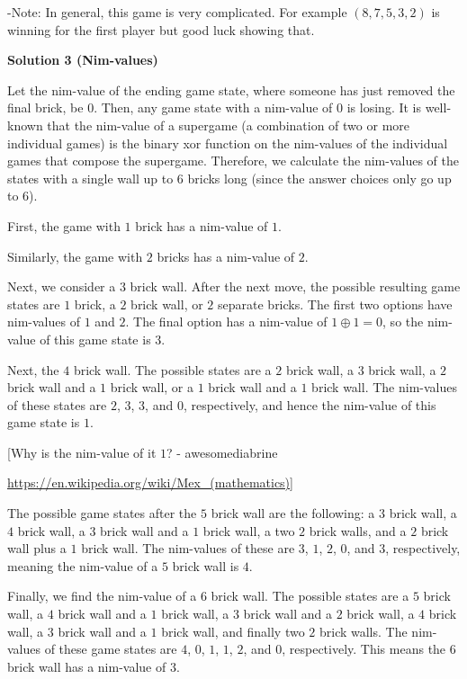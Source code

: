 \begin{enumerate}
 -Note: In general, this game is very complicated. For example $(8, 7, 5, 3, 2)$ is winning for the first player but good luck showing that.

 



\textbf{Solution 3 (Nim-values)}

Let the nim-value of the ending game state, where someone has just removed the final brick, be $0$. Then, any game state with a nim-value of $0$ is losing. It is well-known that the nim-value of a supergame (a combination of two or more individual games) is the binary xor function on the nim-values of the individual games that compose the supergame. Therefore, we calculate the nim-values of the states with a single wall up to $6$ bricks long (since the answer choices only go up to $6$). 

 First, the game with $1$ brick has a nim-value of $1$. 

 Similarly, the game with $2$ bricks has a nim-value of $2$.

 Next, we consider a $3$ brick wall. After the next move, the possible resulting game states are $1$ brick, a $2$ brick wall, or $2$ separate bricks. The first two options have nim-values of $1$ and $2$. The final option has a nim-value of $1\oplus 1 = 0$, so the nim-value of this game state is $3$. 

 Next, the $4$ brick wall. The possible states are a $2$ brick wall, a $3$ brick wall, a $2$ brick wall and a $1$ brick wall, or a $1$ brick wall and a $1$ brick wall. The nim-values of these states are $2$, $3$, $3$, and $0$, respectively, and hence the nim-value of this game state is $1$.

 [Why is the nim-value of it $1$? - awesomediabrine

 \href{https://en.wikipedia.org/wiki/Mex\_(mathematics)}{https://en.wikipedia.org/wiki/Mex\_(mathematics)}]

 The possible game states after the $5$ brick wall are the following: a $3$ brick wall, a $4$ brick wall, a $3$ brick wall and a $1$ brick wall, a two $2$ brick walls, and a $2$ brick wall plus a $1$ brick wall. The nim-values of these are $3$, $1$, $2$, $0$, and $3$, respectively, meaning the nim-value of a $5$ brick wall is $4$. 

 Finally, we find the nim-value of a $6$ brick wall. The possible states are a $5$ brick wall, a $4$ brick wall and a $1$ brick wall, a $3$ brick wall and a $2$ brick wall, a $4$ brick wall, a $3$ brick wall and a $1$ brick wall, and finally two $2$ brick walls. The nim-values of these game states are $4$, $0$, $1$, $1$, $2$, and $0$, respectively. This means the $6$ brick wall has a nim-value of $3$. 


\end{enumerate}
